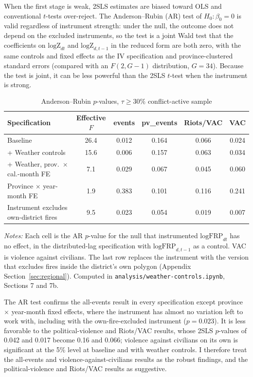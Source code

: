 \documentclass[12pt]{article}
\begin{document}
When the first stage is weak, 2SLS estimates are biased toward OLS and conventional $t$-tests over-reject. The Anderson--Rubin (AR) test of $H_0\!: \beta_0 = 0$ is valid regardless of instrument strength: under the null, the outcome does not depend on the excluded instruments, so the test is a joint Wald test that the coefficients on $\text{logZ}_{dt}$ and $\text{logZ}_{d,t-1}$ in the reduced form are both zero, with the same controls and fixed effects as the IV specification and province-clustered standard errors (compared with an $F(2, G-1)$ distribution, $G = 34$). Because the test is joint, it can be less powerful than the 2SLS $t$-test when the instrument is strong.

\begin{table}[H]
\centering
\caption{Anderson--Rubin $p$-values, $\tau \geq 30\%$ conflict-active sample}
\label{tab:ar}
\begin{tabular}{lccccc}
\toprule
Specification & Effective $F$ & events & pv\_events & Riots/VAC & VAC \\
\midrule
Baseline                                         & 26.4 & 0.012 & 0.164 & 0.066 & 0.024 \\
+ Weather controls                               & 15.6 & 0.006 & 0.157 & 0.063 & 0.034 \\
+ Weather, prov.\ $\times$ cal.-month FE         & 7.1  & 0.029 & 0.067 & 0.045 & 0.060 \\
Province $\times$ year-month FE                  & 1.9  & 0.383 & 0.101 & 0.116 & 0.241 \\
Instrument excludes own-district fires           & 9.5  & 0.023 & 0.054 & 0.019 & 0.007 \\
\bottomrule
\end{tabular}
\begin{minipage}{0.9\textwidth}
\vspace{4pt}
\footnotesize \emph{Notes:} Each cell is the AR $p$-value for the null that instrumented $\text{logFRP}_{dt}$ has no effect, in the distributed-lag specification with $\text{logFRP}_{d,t-1}$ as a control. VAC is violence against civilians. The last row replaces the instrument with the version that excludes fires inside the district's own polygon (Appendix Section~\ref{sec:regional}). Computed in \texttt{analysis/weather-controls.ipynb}, Sections 7 and 7b.
\end{minipage}
\end{table}

The AR test confirms the all-events result in every specification except province $\times$ year-month fixed effects, where the instrument has almost no variation left to work with, including with the own-fire-excluded instrument ($p=0.023$). It is less favorable to the political-violence and Riots/VAC results, whose 2SLS $p$-values of 0.042 and 0.017 become 0.16 and 0.066; violence against civilians on its own is significant at the 5\% level at baseline and with weather controls. I therefore treat the all-events and violence-against-civilians results as the robust findings, and the political-violence and Riots/VAC results as suggestive.
\end{document}
